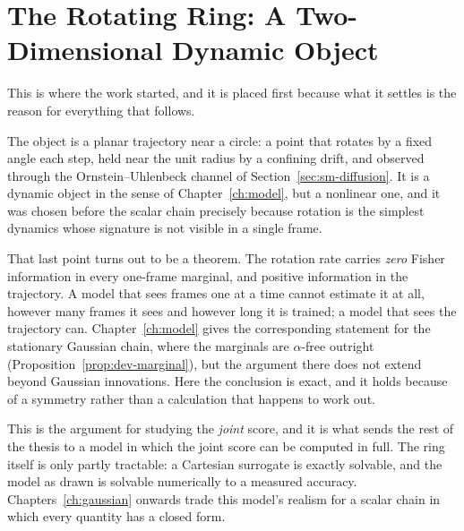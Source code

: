 %

\chapter{The Rotating Ring: A Two-Dimensional Dynamic Object}
\label{ch:ring}

This is where the work started, and it is placed first because what it settles
is the reason for everything that follows.

The object is a planar trajectory near a circle: a point that rotates by a
fixed angle each step, held near the unit radius by a confining drift, and
observed through the Ornstein--Uhlenbeck channel of
Section~\ref{sec:sm-diffusion}. It is a dynamic object in the sense of
Chapter~\ref{ch:model}, but a nonlinear one, and it was chosen before the
scalar chain precisely because rotation is the simplest dynamics whose
signature is not visible in a single frame.

That last point turns out to be a theorem. The rotation rate carries
\emph{zero} Fisher information in every one-frame marginal, and positive
information in the trajectory. A model that sees frames one at a time cannot
estimate it at all, however many frames it sees and however long it is trained;
a model that sees the trajectory can. Chapter~\ref{ch:model} gives the
corresponding statement for the stationary Gaussian chain, where the marginals
are $\alpha$-free outright (Proposition~\ref{prop:dev-marginal}), but the
argument there does not extend beyond Gaussian innovations. Here the conclusion
is exact, and it holds because of a symmetry rather than a calculation that
happens to work out.

This is the argument for studying the \emph{joint} score, and it is what sends
the rest of the thesis to a model in which the joint score can be computed in
full. The ring itself is only partly tractable: a Cartesian surrogate is exactly
solvable, and the model as drawn is solvable numerically to a measured accuracy.
Chapters~\ref{ch:gaussian} onwards trade this model's realism for a scalar
chain in which every quantity has a closed form.

